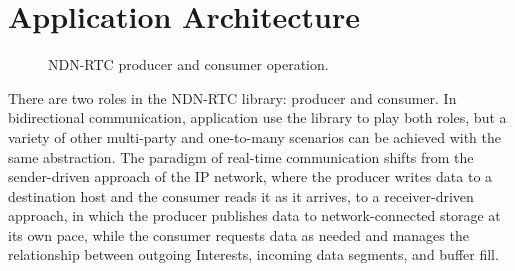 \documentclass{icn/sig-alternate-2013} %
\newcommand{\ndnrtcName}{NDN-RTC} %
\begin{document}

\section{Application Architecture}
\label{sec:arch}

\begin{figure}[t!]
\centering
{}\qquad
{}
\caption{\ndnrtcName{} producer and consumer operation.}
\end{figure}

There are two roles in the \ndnrtcName{} library: producer and consumer.  In bidirectional communication, application use the library to play both roles, but a variety of other multi-party and one-to-many scenarios can be achieved with the same abstraction.  The paradigm of real-time communication shifts from the sender-driven approach of the IP network, where the producer writes data to a destination host and the consumer reads it as it arrives, to a receiver-driven approach, in which the producer publishes data to network-connected storage at its own pace, while the consumer requests data as needed and manages the relationship between outgoing Interests, incoming data segments, and buffer fill. 
%

\end{document}
